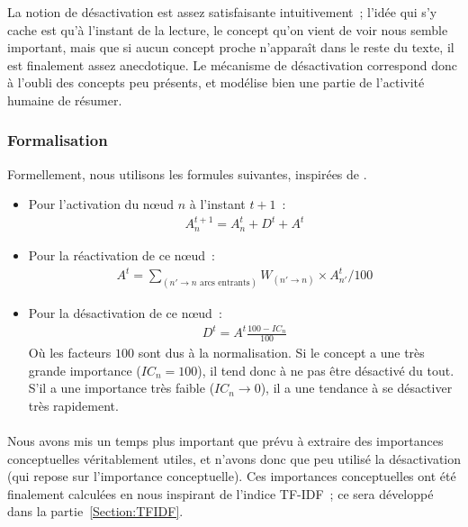 \documentclass[a4paper, 12pt]{article}
\begin{document}
La notion de désactivation est assez satisfaisante intuitivement~; l'idée qui s'y cache est qu'à l'instant de la lecture, le concept qu'on vient de voir nous semble important, mais que si aucun concept proche n'apparaît dans le reste du texte, il est finalement assez anecdotique. Le mécanisme de désactivation correspond donc à l'oubli des concepts peu présents, et modélise bien une partie de l'activité humaine de résumer.\\


\subsubsection{Formalisation}
Formellement, nous utilisons les formules suivantes, inspirées de \cite{parmentier_specification_1998}.

\begin{itemize}
  \item Pour l'activation du n\oe{}ud $n$ à l'instant $t+1$~:
\begin{align}
 A_n^{t+1} = A_n^t + D^t + A^t
\end{align}
\item Pour la réactivation de ce n\oe{}ud~:
\begin{align}
 A^t = \sum_{(n' \rightarrow n \text{\ arcs entrants})} W_{(n'\rightarrow  n)} \times A_{n'}^t / 100
\end{align}
\item Pour la désactivation de ce n\oe{}ud~:
\begin{align}
 D^t = A^t \frac{100- IC_n}{100}
\end{align}
Où les facteurs $100$ sont dus à la normalisation. Si le concept a une très grande importance ($IC_n = 100$), il tend donc à ne pas être désactivé du tout. S'il a une importance très faible ($IC_n \rightarrow 0$), il a une tendance à se désactiver très rapidement.
\end{itemize}

\paragraph{}
Nous avons mis un temps plus important que prévu à extraire des importances conceptuelles véritablement utiles, et n'avons donc que peu utilisé la désactivation (qui repose sur l'importance conceptuelle). Ces importances conceptuelles ont été finalement calculées en nous inspirant de l'indice TF-IDF~; ce sera développé dans la partie~\ref{Section:TFIDF}.
\end{document}
